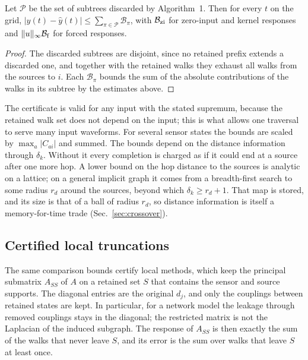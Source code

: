 \begin{theorem}\label{thm:certificate}
Let $\mathcal{P}$ be the set of subtrees discarded by Algorithm~1. Then for every $t$ on the grid, $|y(t)-\hat y(t)|\le\sum_{\pi\in\mathcal{P}}\mathcal{B}_\pi$, with $\mathcal{B}_{\rm zi}$ for zero-input and kernel responses and $\|u\|_\infty\mathcal{B}_{\rm f}$ for forced responses.
\end{theorem}
\begin{proof}
The discarded subtrees are disjoint, since no retained prefix extends a discarded one, and together with the retained walks they exhaust all walks from the sources to $i$. Each $\mathcal{B}_\pi$ bounds the sum of the absolute contributions of the walks in its subtree by the estimates above.
\end{proof}
The certificate is valid for any input with the stated supremum, because the retained walk set does not depend on the input; this is what allows one traversal to serve many input waveforms. For several sensor states the bounds are scaled by $\max_a|C_{ai}|$ and summed. The bounds depend on the distance information through $\delta_k$. Without it every completion is charged as if it could end at a source after one more hop. A lower bound on the hop distance to the sources is analytic on a lattice; on a general implicit graph it comes from a breadth-first search to some radius $r_d$ around the sources, beyond which $\delta_k\ge r_d+1$. That map is stored, and its size is that of a ball of radius $r_d$, so distance information is itself a memory-for-time trade (Sec.~\ref{sec:crossover}).

\subsection{Certified local truncations}\label{sec:local}
The same comparison bounds certify local methods, which keep the principal submatrix $A_{SS}$ of $A$ on a retained set $S$ that contains the sensor and source supports. The diagonal entries are the original $d_j$, and only the couplings between retained states are kept. In particular, for a network model the leakage through removed couplings stays in the diagonal; the restricted matrix is not the Laplacian of the induced subgraph. The response of $A_{SS}$ is then exactly the sum of the walks that never leave $S$, and its error is the sum over walks that leave $S$ at least once.

